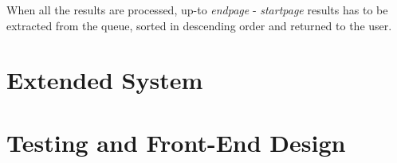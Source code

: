 When all the results are processed, up-to {\it endpage} - {\it startpage} results has to be extracted from the queue, sorted in descending order and returned to the user.


\section{Extended System}

\section{Testing and Front-End Design}

